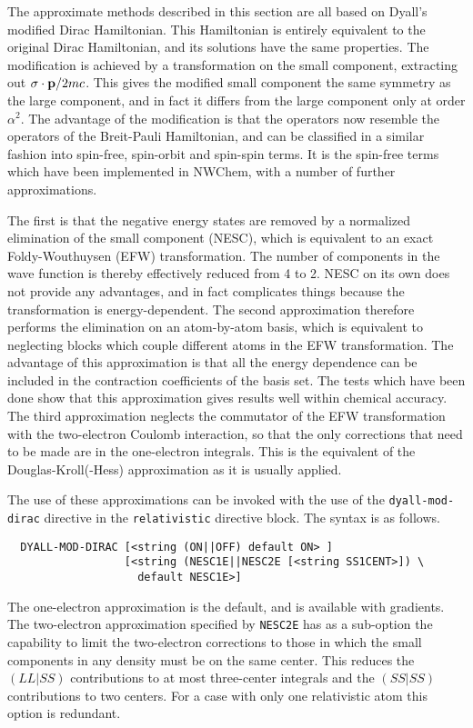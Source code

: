 The approximate methods described in this section are all based on Dyall's
modified Dirac Hamiltonian. This Hamiltonian is entirely equivalent to the
original Dirac Hamiltonian, and its solutions have the same properties.
The modification is achieved by a transformation on the small component,
extracting out $\sigma\cdot{\bf p}/2mc$. This gives the modified small
component the same symmetry as the large component, and in fact it differs
from the large component only at order $\alpha^2$.  The advantage of the
modification is that the operators now resemble the operators of the
Breit-Pauli Hamiltonian, and can be classified in a similar fashion into
spin-free, spin-orbit and spin-spin terms. It is the spin-free terms which
have been implemented in NWChem, with a number of further approximations.

The first is that the negative energy states are removed by a normalized
elimination of the small component (NESC), which is equivalent to an exact
Foldy-Wouthuysen (EFW) transformation. The number of components in the wave
function is thereby effectively reduced from 4 to 2. NESC on its own does
not provide any advantages, and in fact complicates things because the
transformation is energy-dependent. The second approximation therefore
performs the elimination on an atom-by-atom basis, which is equivalent to
neglecting blocks which couple different atoms in the EFW transformation.
The advantage of this approximation is that all the energy dependence can be
included in the contraction coefficients of the basis set.  The tests which
have been done show that this approximation gives results well within
chemical accuracy. The third approximation neglects the commutator of the
EFW transformation with the two-electron Coulomb interaction, so that the
only corrections that need to be made are in the one-electron integrals.
This is the equivalent of the Douglas-Kroll(-Hess) approximation as it is
usually applied.

The use of these approximations can be invoked with the use of the
\verb+dyall-mod-dirac+ directive in the \verb+relativistic+ directive block.
The syntax is as follows.

\begin{verbatim}
  DYALL-MOD-DIRAC [<string (ON||OFF) default ON> ] 
                  [<string (NESC1E||NESC2E [<string SS1CENT>]) \
                    default NESC1E>]

\end{verbatim}

The one-electron approximation is the default, and is available with
gradients. The two-electron approximation specified by \verb+NESC2E+ has as
a sub-option the capability to limit the two-electron corrections to those
in which the small components in any density must be on the same center.
This reduces the $(LL|SS)$ contributions to at most three-center integrals
and the $(SS|SS)$ contributions to two centers. For a case with only one
relativistic atom this option is redundant. 

